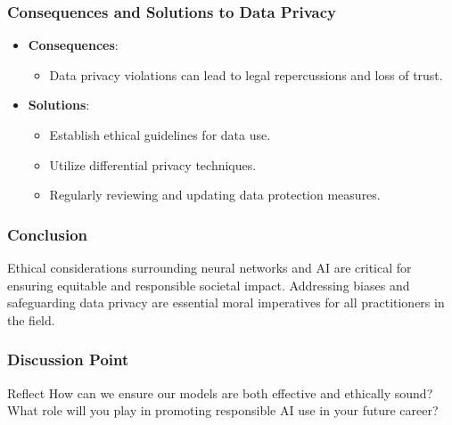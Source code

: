 \documentclass[aspectratio=169]{beamer}
\begin{document}
\begin{frame}[fragile]
    \frametitle{Consequences and Solutions to Data Privacy}
    \begin{itemize}
        \item \textbf{Consequences}:
        \begin{itemize}
            \item Data privacy violations can lead to legal repercussions and loss of trust.
        \end{itemize}
        \item \textbf{Solutions}:
        \begin{itemize}
            \item Establish ethical guidelines for data use.
            \item Utilize differential privacy techniques.
            \item Regularly reviewing and updating data protection measures.
        \end{itemize}
    \end{itemize}
\end{frame}

\begin{frame}[fragile]
    \frametitle{Conclusion}
    Ethical considerations surrounding neural networks and AI are critical for ensuring equitable and responsible societal impact. Addressing biases and safeguarding data privacy are essential moral imperatives for all practitioners in the field.
\end{frame}

\begin{frame}[fragile]
    \frametitle{Discussion Point}
    \begin{block}{Reflect}
        How can we ensure our models are both effective and ethically sound? What role will you play in promoting responsible AI use in your future career?
    \end{block}
\end{frame}
\end{document}
